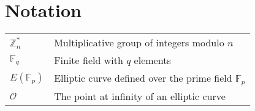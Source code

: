 \chapter{Notation}

\begin{table}[H]
	\begin{tabular}{ll}
		$\mathbb{Z}_n^\ast$      & Multiplicative group of integers modulo $n$                 \\
		$\mathbb{F}_q$           & Finite field with $q$ elements                              \\
		$E(\mathbb{F}_p)$        & Elliptic curve defined over the prime field $\mathbb{F}_p$  \\
		$\mathcal{O}$            & The point at infinity of an elliptic curve                  \\ 
	\end{tabular}
\end{table}